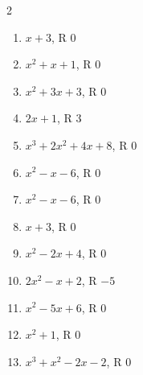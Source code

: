 \documentclass[11pt]{article}
\begin{document}
\begin{keybox}
\begin{multicols}{2}
\small
\begin{enumerate}[leftmargin=*,itemsep=3pt]
  \item $x+3$, R $0$
  \item $x^2+x+1$, R $0$
  \item $x^2+3x+3$, R $0$
  \item $2x+1$, R $3$
  \item $x^3+2x^2+4x+8$, R $0$
  \item $x^2-x-6$, R $0$
  \item $x^2-x-6$, R $0$
  \item $x+3$, R $0$
  \item $x^2-2x+4$, R $0$
  \item $2x^2-x+2$, R $-5$
  \item $x^2-5x+6$, R $0$
  \item $x^2+1$, R $0$
  \item $x^3+x^2-2x-2$, R $0$
\end{enumerate}
\end{multicols}
\end{keybox}
\end{document}
